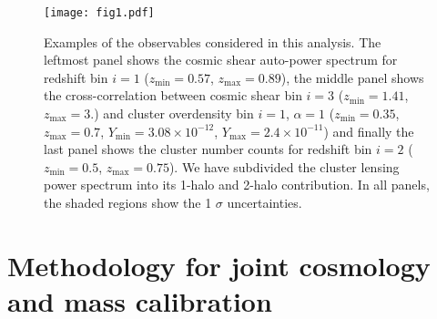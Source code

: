\documentclass[%
 reprint,
nofootinbib,
 amsmath,amssymb,
 aps,
]{revtex4-1}
\begin{document}
\begin{figure*}
\begin{center}
\texttt{[image: fig1.pdf]}
 \caption{Examples of the observables considered in this analysis. The leftmost panel shows the cosmic shear auto-power spectrum for redshift bin $i=1$ ($z_{\mathrm{min}} = 0.57$, $z_{\mathrm{max}} = 0.89$), the middle panel shows the cross-correlation between cosmic shear bin $i=3$ ($z_{\mathrm{min}} = 1.41$, $z_{\mathrm{max}} = 3.$) and cluster overdensity bin $i=1$, $\alpha=1$ ($z_{\mathrm{min}} = 0.35$, $z_{\mathrm{max}} = 0.7$, $Y_{\mathrm{min}} = 3.08 \times 10^{-12}$, $Y_{\mathrm{max}} = 2.4 \times 10^{-11}$) and finally the last panel shows the cluster number counts for redshift bin $i=2$ ($z_{\mathrm{min}} = 0.5$, $z_{\mathrm{max}} = 0.75$). We have subdivided the cluster lensing power spectrum into its 1-halo and 2-halo contribution. In all panels, the shaded regions show the 1 $\sigma$ uncertainties.}
\label{fig:observables}
\end{center}
\end{figure*}

\section{Methodology for joint cosmology and mass calibration}\label{sec:mass-calib}
\end{document}
